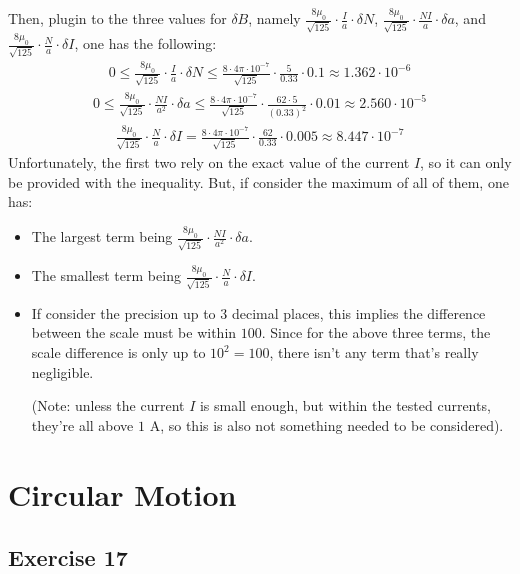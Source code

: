 \documentclass{article}
\begin{document}
Then, plugin to the three values for $\delta B$, namely $\frac{8\mu_0}{\sqrt{125}}\cdot\frac{I}{a}\cdot \delta N$, $\frac{8\mu_0}{\sqrt{125}}\cdot\frac{N I}{a}\cdot\delta a$, and $\frac{8\mu_0}{\sqrt{125}}\cdot\frac{N}{a}\cdot\delta I$, one has the following:
\begin{align}
    0\leq \frac{8\mu_0}{\sqrt{125}}\cdot \frac{I}{a}\cdot \delta N \leq \frac{8\cdot 4\pi\cdot 10^{-7}}{\sqrt{125}}\cdot\frac{5}{0.33}\cdot 0.1 \approx 1.362\cdot 10^{-6}
\end{align}
\begin{align}
    0\leq \frac{8\mu_0}{\sqrt{125}}\cdot\frac{N I}{a^2}\cdot \delta a \leq \frac{8\cdot 4\pi\cdot 10^{-7}}{\sqrt{125}}\cdot\frac{62\cdot 5}{(0.33)^2}\cdot 0.01 \approx 2.560 \cdot 10^{-5}
\end{align}
\begin{align}
    \frac{8\mu_0}{\sqrt{125}}\cdot\frac{N}{a}\cdot \delta I = \frac{8\cdot 4\pi\cdot 10^{-7}}{\sqrt{125}}\cdot\frac{62}{0.33}\cdot 0.005 \approx 8.447\cdot 10^{-7}
\end{align}
Unfortunately, the first two rely on the exact value of the current $I$, so it can only be provided with the inequality. But, if consider the maximum of all of them, one has:
\begin{itemize}
    \item The largest term being $\frac{8\mu_0}{\sqrt{125}}\cdot\frac{N I}{a^2}\cdot \delta a $.
    \item The smallest term being $\frac{8\mu_0}{\sqrt{125}}\cdot\frac{N}{a}\cdot \delta I$.
    \item If consider the precision up to 3 decimal places, this implies the difference between the scale must be within $100$. Since for the above three terms, the scale difference is only up to $10^2 = 100$, there isn't any term that's really negligible.
    
    (Note: unless the current $I$ is small enough, but within the tested currents, they're all above $1$ A, so this is also not something needed to be considered).
\end{itemize}

\hfil

\section{Circular Motion}
\subsection{Exercise 17}
\end{document}
